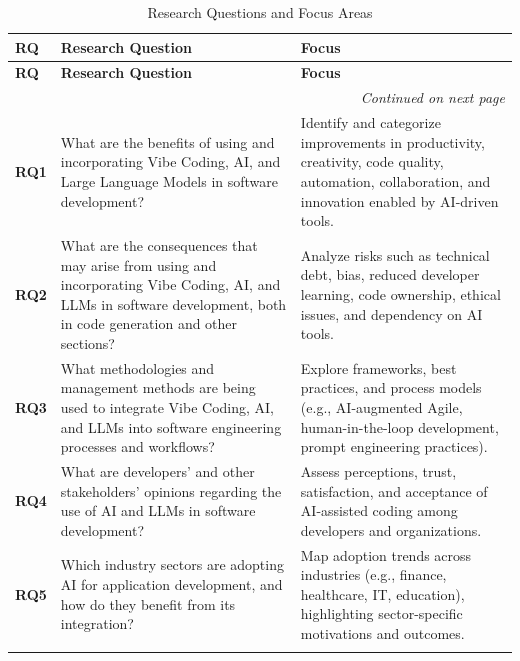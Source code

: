 {\small
\begin{longtable}{p{0.7cm} p{7.5cm} p{6.5cm}}
\caption{Research Questions and Focus Areas}
\label{tab:RQs} \\
\toprule
\textbf{RQ} & \textbf{Research Question} & \textbf{Focus} \\
\midrule
\endfirsthead

\toprule
\textbf{RQ} & \textbf{Research Question} & \textbf{Focus} \\
\midrule
\endhead

\midrule
\multicolumn{3}{r}{\textit{Continued on next page}}\\
\bottomrule
\endfoot

\bottomrule
\endlastfoot

\textbf{RQ1} & What are the benefits of using and incorporating Vibe Coding, AI, and Large Language Models in software development? & Identify and categorize improvements in productivity, creativity, code quality, automation, collaboration, and innovation enabled by AI-driven tools. \\
\addlinespace

\textbf{RQ2} & What are the consequences that may arise from using and incorporating Vibe Coding, AI, and LLMs in software development, both in code generation and other sections? & Analyze risks such as technical debt, bias, reduced developer learning, code ownership, ethical issues, and dependency on AI tools. \\
\addlinespace

\textbf{RQ3} & What methodologies and management methods are being used to integrate Vibe Coding, AI, and LLMs into software engineering processes and workflows? & Explore frameworks, best practices, and process models (e.g., AI-augmented Agile, human-in-the-loop development, prompt engineering practices). \\
\addlinespace

\textbf{RQ4} & What are developers’ and other stakeholders’ opinions regarding the use of AI and LLMs in software development? & Assess perceptions, trust, satisfaction, and acceptance of AI-assisted coding among developers and organizations. \\
\addlinespace

\textbf{RQ5} & Which industry sectors are adopting AI for application development, and how do they benefit from its integration? & Map adoption trends across industries (e.g., finance, healthcare, IT, education), highlighting sector-specific motivations and outcomes. \\
\addlinespace

\end{longtable}}

